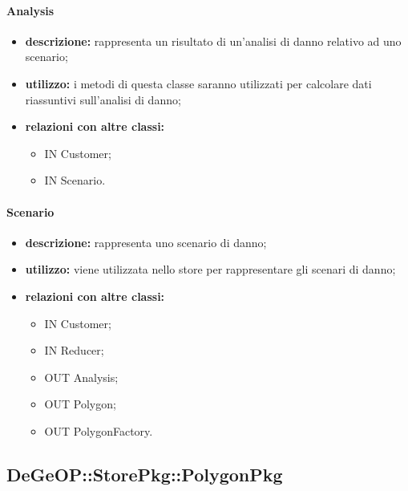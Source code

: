 \paragraph{Analysis}
\begin{itemize}
	\item \textbf{descrizione:} rappresenta un risultato di un'analisi di danno relativo ad uno scenario;
	\item \textbf{utilizzo:} i metodi di questa classe saranno utilizzati per calcolare dati riassuntivi sull'analisi di danno;
	\item \textbf{relazioni con altre classi:} 
	\begin{itemize}
		\item IN Customer;
		\item IN Scenario.
	\end{itemize}
\end{itemize}
\paragraph{Scenario}
\begin{itemize}
	\item \textbf{descrizione:} rappresenta uno scenario di danno;
	\item \textbf{utilizzo:} viene utilizzata nello store per rappresentare gli scenari di danno;
	\item \textbf{relazioni con altre classi:} 
	\begin{itemize}
		\item IN Customer;
		\item IN Reducer;
		\item OUT Analysis;
		\item OUT Polygon;
		\item OUT PolygonFactory.
	\end{itemize}
\end{itemize}
\newpage
\subsection{DeGeOP::StorePkg::PolygonPkg}
\label{pkg::PolygonPkg}
